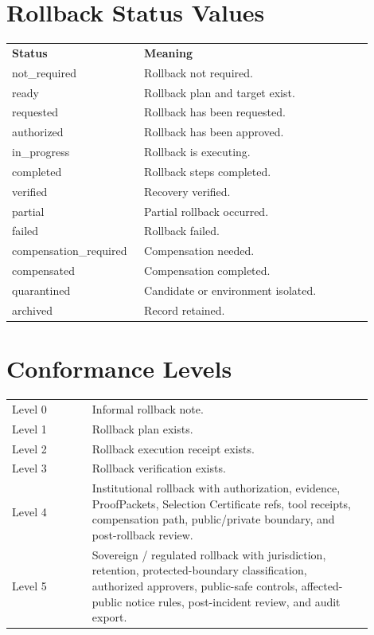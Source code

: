 \documentclass[11pt]{article}
\begin{document}
\section{Rollback Status Values}
\begin{longtable}{p{0.3\linewidth}p{0.6\linewidth}}
\textbf{Status} & \textbf{Meaning}\\
not\_required & Rollback not required.\\
ready & Rollback plan and target exist.\\
requested & Rollback has been requested.\\
authorized & Rollback has been approved.\\
in\_progress & Rollback is executing.\\
completed & Rollback steps completed.\\
verified & Recovery verified.\\
partial & Partial rollback occurred.\\
failed & Rollback failed.\\
compensation\_required & Compensation needed.\\
compensated & Compensation completed.\\
quarantined & Candidate or environment isolated.\\
archived & Record retained.\\
\end{longtable}

\section{Conformance Levels}
\begin{longtable}{p{0.20\linewidth}p{0.70\linewidth}}
Level 0 & Informal rollback note.\\
Level 1 & Rollback plan exists.\\
Level 2 & Rollback execution receipt exists.\\
Level 3 & Rollback verification exists.\\
Level 4 & Institutional rollback with authorization, evidence, ProofPackets, Selection Certificate refs, tool receipts, compensation path, public/private boundary, and post-rollback review.\\
Level 5 & Sovereign / regulated rollback with jurisdiction, retention, protected-boundary classification, authorized approvers, public-safe controls, affected-public notice rules, post-incident review, and audit export.\\
\end{longtable}
\end{document}
